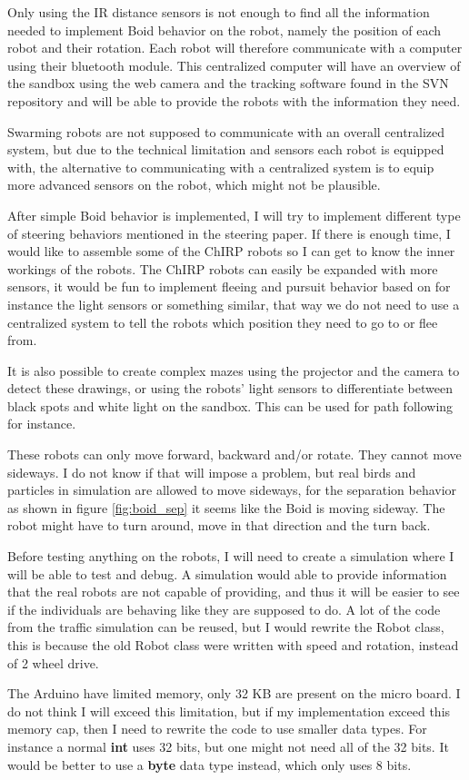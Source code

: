 Only using the IR distance sensors is not enough to find all the information needed to implement Boid behavior on the robot, namely the position of each robot and their rotation.
Each robot will therefore communicate with a computer using their bluetooth module.
This centralized computer will have an overview of the sandbox using the web camera and the tracking software found in the SVN repository and will be able to provide the robots with the information they need.

Swarming robots are not supposed to communicate with an overall centralized system, but due to the technical limitation and sensors each robot is equipped with, the alternative to communicating with a centralized system is to equip more advanced sensors on the robot, which might not be plausible.

After simple Boid behavior is implemented, I will try to implement different type of steering behaviors mentioned in the steering paper. If there is enough time, I would like to assemble some of the ChIRP robots so I can get to know the inner workings of the robots. The ChIRP robots can easily be expanded with more sensors, it would be fun to implement fleeing and pursuit behavior based on for instance the light sensors or something similar, that way we do not need to use a centralized system to tell the robots which position they need to go to or flee from.

It is also possible to create complex mazes using the projector and the camera to detect these drawings, or using the robots' light sensors to differentiate between black spots and white light on the sandbox. This can be used for path following for instance.

These robots can only move forward, backward and/or rotate. They cannot move sideways. I do not know if that will impose a problem, but real birds and particles in simulation are allowed to move sideways, for the separation behavior as shown in figure \ref{fig:boid_sep} it seems like the Boid is moving sideway. The robot might have to turn around, move in that direction and the turn back.

Before testing anything on the robots, I will need to create a simulation where I will be able to test and debug. A simulation would able to provide information that the real robots are not capable of providing, and thus it will be easier to see if the individuals are behaving like they are supposed to do. A lot of the code from the traffic simulation can be reused, but I would rewrite the Robot class, this is because the old Robot class were written with speed and rotation, instead of 2 wheel drive.

The Arduino have limited memory, only 32 KB are present on the micro board. I do not think I will exceed this limitation, but if my implementation exceed this memory cap, then I need to rewrite the code to use smaller data types. For instance a normal \textbf{int} uses 32 bits, but one might not need all of the 32 bits. It would be better to use a \textbf{byte} data type instead, which only uses 8 bits.


